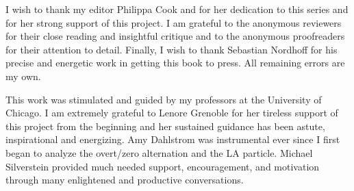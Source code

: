 \begin{refsection}

I wish to thank my editor Philippa Cook and for her dedication to this series and for her strong support of this project. I am grateful to the anonymous reviewers for their close reading and insightful critique and to the anonymous proofreaders for their attention to detail. Finally, I wish to thank Sebastian Nordhoff for his precise and energetic work in getting this book to press. All remaining errors are my own.

This work was stimulated and guided by my professors at the University of Chicago. I am extremely grateful to Lenore Grenoble for her tireless support of this project from the beginning and her sustained guidance has been astute, inspirational and energizing. Amy Dahlstrom was instrumental ever since I first began to analyze the overt/zero  alternation and the LA particle. Michael Silverstein provided much needed support, encouragement, and motivation through many enlightened and productive conversations.



\end{refsection}
